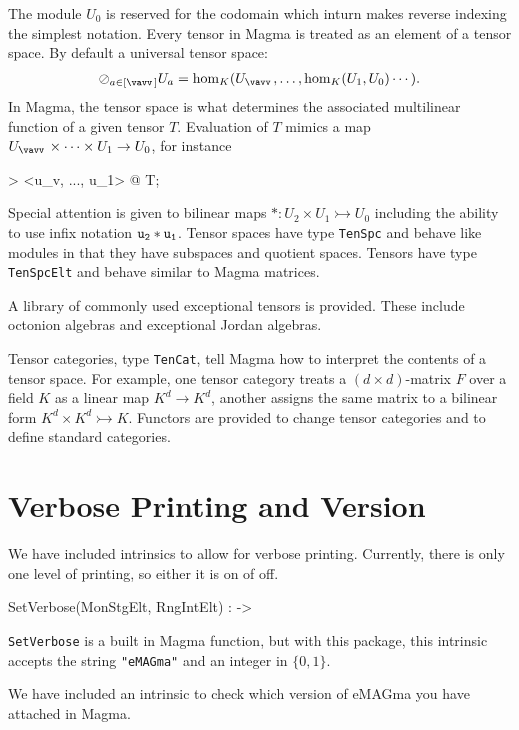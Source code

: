 \documentclass{documentation}
\begin{document}
The module $U_0$ is reserved for the codomain which inturn makes
reverse indexing the simplest notation.
Every tensor in Magma is treated as an element of a tensor space.
By default a universal tensor space:
\begin{align*}
	\rversor_{a\in[\vav]} U_a = \hom_K(U_{\vav},\dots,\hom_K(U_1,U_0)\cdots).
\end{align*} 
In Magma, the tensor space is what determines the associated
multilinear function of a given tensor $T$.  
Evaluation of $T$ mimics a map
$U_{\vav}\times \cdots \times U_1\to U_0$, for instance
\begin{code}
> <u_v, ..., u_1> @ T;
\end{code}
Special attention is given to bilinear maps 
$*:U_2\times U_1\rightarrowtail U_0$
including the ability to use infix notation ${\tt u_2*u_1}$.
Tensor spaces have type {\tt TenSpc} and behave like modules 
in that they have subspaces and quotient spaces.  Tensors have type 
{\tt TenSpcElt} and behave similar to Magma matrices.


A library of commonly used exceptional tensors is provided.
These include octonion algebras and exceptional Jordan algebras.
 
Tensor categories, type {\tt TenCat}, tell Magma how to interpret the
contents of a tensor space.  For example, one tensor category treats a 
$(d\times d)$-matrix $F$ over a field $K$ as a linear map $K^d\to K^d$,
another assigns the same matrix to a bilinear form 
$K^d\times K^d\rightarrowtail K$.  Functors are provided to change
tensor categories and to define standard categories.  

\section{Verbose Printing and Version}

We have included intrinsics to allow for verbose printing. 
Currently, there is only one level of printing, so either it is on of off. 

\begin{intrinsics}
SetVerbose(MonStgElt, RngIntElt) : -> 
\end{intrinsics}

{\tt SetVerbose} is a built in Magma function, but with this package, this intrinsic accepts the string {\tt "eMAGma"} and an integer in $\{0,1\}$. 

We have included an intrinsic to check which version of eMAGma you have attached in Magma.
\end{document}
